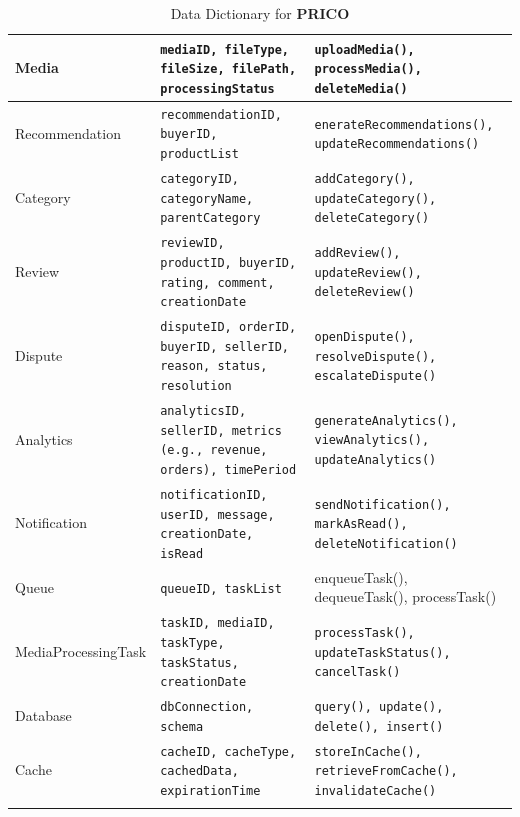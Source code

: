 \documentclass[12pt]{report}
\begin{document}
\begin{longtable}[H]{|l|p{5cm}|p{6.5cm}||}
	\hline
	Media               & \texttt{mediaID, fileType, fileSize, filePath, processingStatus}                                          & \texttt{uploadMedia(), processMedia(), deleteMedia()}                                    \\
	\hline
	Recommendation      & \texttt{recommendationID, buyerID, productList}                                                           & \texttt{enerateRecommendations(), updateRecommendations()}                               \\
	\hline
	Category            & \texttt{categoryID, categoryName, parentCategory}                                                         & \texttt{addCategory(), updateCategory(), deleteCategory()}                               \\
	\hline
	Review              & \texttt{reviewID, productID, buyerID, rating, comment, creationDate}                                      & \texttt{addReview(), updateReview(), deleteReview()}                                     \\
	\hline
	Dispute             & \texttt{disputeID, orderID, buyerID, sellerID, reason, status, resolution}                                & \texttt{openDispute(), resolveDispute(), escalateDispute()}                              \\
	\hline
	Analytics           & \texttt{analyticsID, sellerID, metrics (e.g., revenue, orders), timePeriod}                               & \texttt{generateAnalytics(), viewAnalytics(), updateAnalytics()}                         \\
	\hline
	Notification        & \texttt{notificationID, userID, message, creationDate, isRead}                                            & \texttt{sendNotification(), markAsRead(), deleteNotification()}                          \\
	\hline
	Queue               & \texttt{queueID, taskList}                                                                                & enqueueTask(), dequeueTask(), processTask()                                              \\
	\hline
	MediaProcessingTask & \texttt{taskID, mediaID, taskType, taskStatus, creationDate}                                              & \texttt{processTask(), updateTaskStatus(), cancelTask()}                                 \\
	\hline
	Database            & \texttt{dbConnection, schema}                                                                             & \texttt{query(), update(), delete(), insert()}                                           \\
	\hline
	Cache               & \texttt{cacheID, cacheType, cachedData, expirationTime}                                                   & \texttt{storeInCache(), retrieveFromCache(), invalidateCache()}                          \\
	\hline
	\hline
	\caption{Data Dictionary for \textbf{PRICO}}\label{tab:table3}
\end{longtable}
\end{document}
